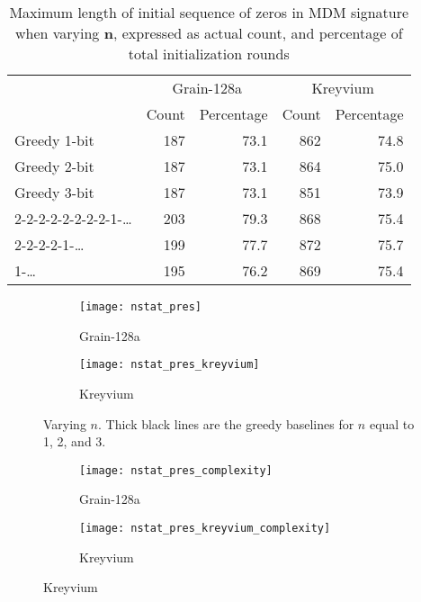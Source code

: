 {%

\begin{table}[htb]
	\centering
    \caption{Maximum length of initial sequence of zeros in MDM signature when varying $\bm{n}$, expressed as actual count, and percentage of total initialization rounds}
    \begin{tabular}{lrrrr}
    	\toprule
        & \multicolumn{2}{c}{Grain-128a} & \multicolumn{2}{c}{Kreyvium} \\
        \cmidrule(r){2-3} \cmidrule(l){4-5}
                  & Count & Percentage & Count & Percentage \\
        \midrule
        Greedy 1-bit & 187 & 73.1 & 862 & 74.8 \\
        Greedy 2-bit & 187 & 73.1 & 864 & 75.0 \\
        Greedy 3-bit & 187 & 73.1 & 851 & 73.9 \\
        2-2-2-2-2-2-2-2-1-\ldots & 203 & 79.3 & 868 & 75.4 \\
        2-2-2-2-1-\ldots & 199 & 77.7 & 872 & 75.7 \\
        1-\ldots & 195 & 76.2 & 869 & 75.4 \\ 
        \bottomrule
    \end{tabular}
    \label{tbl:n}
\end{table}


\begin{figure}[htbp]
	\centering
	\begin{subfigure}[b]{0.5\textwidth}
		\texttt{[image: nstat\_pres]}
		\captionsetup{singlelinecheck=true}
		\caption{Grain-128a}
		\label{fig:ngrain128a}
	\end{subfigure}%
	\begin{subfigure}[b]{0.5\textwidth}
		\texttt{[image: nstat\_pres\_kreyvium]}
		\captionsetup{singlelinecheck=true}
		\caption{Kreyvium}
		\label{fig:nkreyvium}
	\end{subfigure}
	
	\caption{Varying $n$. Thick black lines are the greedy baselines for $n$ equal to 1, 2, and 3.}
	\label{fig:n}
\end{figure}

\begin{figure}[htbp]
	\centering
	\begin{subfigure}[b]{0.5\textwidth}
		\texttt{[image: nstat\_pres\_complexity]}
		\captionsetup{singlelinecheck=true}
		\caption{Grain-128a}
		\label{fig:ncomplexitygrain128a}
	\end{subfigure}%
	\begin{subfigure}[b]{0.5\textwidth}
		\texttt{[image: nstat\_pres\_kreyvium\_complexity]}
		\captionsetup{singlelinecheck=true}
		\caption{Kreyvium}
		\label{fig:ncomplexitykreyvium}
	\end{subfigure}
	

\end{figure}}
